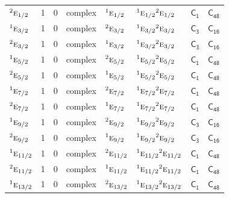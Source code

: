 \documentclass[10pt,a4paper]{article}
\numberwithin{equation}{section}
\newcommand{\grp}[1]{\mathsf{#1}}
\newcommand{\irr}[1]{\text{\normalfont\scshape #1}}
\newcommand{\conjpair}[1]{{}^{#1}}
\begin{document}
{\begin{longtable}{@{}lrrlllll@{}}
$\conjpair{2}\irr{e}_{1/2}$ & 1 & $0$ & complex & $\conjpair{1}\irr{e}_{1/2}$ & $\conjpair{1}\irr{e}_{1/2}\conjpair{2}\irr{e}_{1/2}$ & \href{C1.pdf}{$\grp{C_{1}}$} & $\grp{C_{48}}$\\
$\conjpair{1}\irr{e}_{3/2}$ & 1 & $0$ & complex & $\conjpair{2}\irr{e}_{3/2}$ & $\conjpair{1}\irr{e}_{3/2}\conjpair{2}\irr{e}_{3/2}$ & \href{C3.pdf}{$\grp{C_{3}}$} & $\grp{C_{16}}$\\
$\conjpair{2}\irr{e}_{3/2}$ & 1 & $0$ & complex & $\conjpair{1}\irr{e}_{3/2}$ & $\conjpair{1}\irr{e}_{3/2}\conjpair{2}\irr{e}_{3/2}$ & \href{C3.pdf}{$\grp{C_{3}}$} & $\grp{C_{16}}$\\
$\conjpair{1}\irr{e}_{5/2}$ & 1 & $0$ & complex & $\conjpair{2}\irr{e}_{5/2}$ & $\conjpair{1}\irr{e}_{5/2}\conjpair{2}\irr{e}_{5/2}$ & \href{C1.pdf}{$\grp{C_{1}}$} & $\grp{C_{48}}$\\
$\conjpair{2}\irr{e}_{5/2}$ & 1 & $0$ & complex & $\conjpair{1}\irr{e}_{5/2}$ & $\conjpair{1}\irr{e}_{5/2}\conjpair{2}\irr{e}_{5/2}$ & \href{C1.pdf}{$\grp{C_{1}}$} & $\grp{C_{48}}$\\
$\conjpair{1}\irr{e}_{7/2}$ & 1 & $0$ & complex & $\conjpair{2}\irr{e}_{7/2}$ & $\conjpair{1}\irr{e}_{7/2}\conjpair{2}\irr{e}_{7/2}$ & \href{C1.pdf}{$\grp{C_{1}}$} & $\grp{C_{48}}$\\
$\conjpair{2}\irr{e}_{7/2}$ & 1 & $0$ & complex & $\conjpair{1}\irr{e}_{7/2}$ & $\conjpair{1}\irr{e}_{7/2}\conjpair{2}\irr{e}_{7/2}$ & \href{C1.pdf}{$\grp{C_{1}}$} & $\grp{C_{48}}$\\
$\conjpair{1}\irr{e}_{9/2}$ & 1 & $0$ & complex & $\conjpair{2}\irr{e}_{9/2}$ & $\conjpair{1}\irr{e}_{9/2}\conjpair{2}\irr{e}_{9/2}$ & \href{C3.pdf}{$\grp{C_{3}}$} & $\grp{C_{16}}$\\
$\conjpair{2}\irr{e}_{9/2}$ & 1 & $0$ & complex & $\conjpair{1}\irr{e}_{9/2}$ & $\conjpair{1}\irr{e}_{9/2}\conjpair{2}\irr{e}_{9/2}$ & \href{C3.pdf}{$\grp{C_{3}}$} & $\grp{C_{16}}$\\
$\conjpair{1}\irr{e}_{11/2}$ & 1 & $0$ & complex & $\conjpair{2}\irr{e}_{11/2}$ & $\conjpair{1}\irr{e}_{11/2}\conjpair{2}\irr{e}_{11/2}$ & \href{C1.pdf}{$\grp{C_{1}}$} & $\grp{C_{48}}$\\
$\conjpair{2}\irr{e}_{11/2}$ & 1 & $0$ & complex & $\conjpair{1}\irr{e}_{11/2}$ & $\conjpair{1}\irr{e}_{11/2}\conjpair{2}\irr{e}_{11/2}$ & \href{C1.pdf}{$\grp{C_{1}}$} & $\grp{C_{48}}$\\
$\conjpair{1}\irr{e}_{13/2}$ & 1 & $0$ & complex & $\conjpair{2}\irr{e}_{13/2}$ & $\conjpair{1}\irr{e}_{13/2}\conjpair{2}\irr{e}_{13/2}$ & \href{C1.pdf}{$\grp{C_{1}}$} & $\grp{C_{48}}$\\

\end{longtable}}
\end{document}

